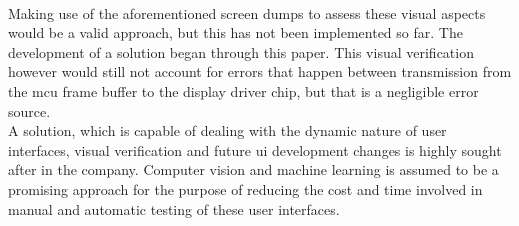 \documentclass[Bachelor, BIC, english, fhCitStyle, IEEE]{BASE/twbook} %
\begin{document}
\\
Making use of the aforementioned screen dumps to assess these visual aspects would be a valid approach, but this has not been implemented so far. The development of a solution began through this paper. This visual verification however would still not account for errors that happen between transmission from the \ac{mcu} frame buffer to the display driver chip, but that is a negligible error source.
\\
A solution, which is capable of dealing with the dynamic nature of user interfaces, visual verification and future \ac{ui} development changes is highly sought after in the company. Computer vision and machine learning is assumed to be a promising approach for the purpose of reducing the cost and time involved in manual and automatic testing of these user interfaces.
\clearpage
\end{document}

